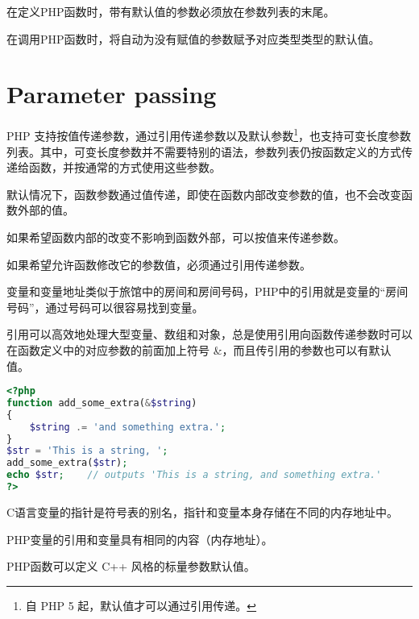 \begin{compactitem}
\item 在定义PHP函数时，带有默认值的参数必须放在参数列表的末尾。
\item 在调用PHP函数时，将自动为没有赋值的参数赋予对应类型类型的默认值。
\end{compactitem}




\section{Parameter passing}



PHP 支持按值传递参数，通过引用传递参数以及默认参数\footnote{自 PHP 5 起，默认值才可以通过引用传递。}，也支持可变长度参数列表。其中，可变长度参数并不需要特别的语法，参数列表仍按函数定义的方式传递给函数，并按通常的方式使用这些参数。


默认情况下，函数参数通过值传递，即使在函数内部改变参数的值，也不会改变函数外部的值。

\begin{compactitem}
\item 如果希望函数内部的改变不影响到函数外部，可以按值来传递参数。
\item 如果希望允许函数修改它的参数值，必须通过引用传递参数。
\end{compactitem}

变量和变量地址类似于旅馆中的房间和房间号码，PHP中的引用就是变量的“房间号码”，通过号码可以很容易找到变量。

引用可以高效地处理大型变量、数组和对象，总是使用引用向函数传递参数时可以在函数定义中的对应参数的前面加上符号 \&，而且传引用的参数也可以有默认值。

\begin{lstlisting}[language=PHP]
<?php
function add_some_extra(&$string)
{
    $string .= 'and something extra.';
}
$str = 'This is a string, ';
add_some_extra($str);
echo $str;    // outputs 'This is a string, and something extra.'
?>
\end{lstlisting}

\begin{compactitem}
\item C语言变量的指针是符号表的别名，指针和变量本身存储在不同的内存地址中。
\item PHP变量的引用和变量具有相同的内容（内存地址）。
\end{compactitem}




PHP函数可以定义 C++ 风格的标量参数默认值。

